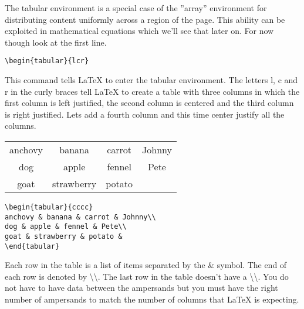 \vspace*{2ex}

The tabular environment is a special case of the ''array'' environment for distributing content uniformly across a region of the page.  This ability can be exploited in mathematical equations which we'll see that later on. For now though look at the first line.

\vspace*{2ex}

\begin{verbatim}
\begin{tabular}{lcr}
\end{verbatim}

\vspace*{2ex}

This command tells LaTeX to enter the tabular environment. The letters l, c and r in the curly braces tell LaTeX to create a table with three columns in which the first column is left justified, the second column is centered and the third column is right justified. Lets add a fourth column and this time center justify all the columns.

\begin{center}
\begin{tabular}{cccc}
anchovy & banana & carrot & Johnny\\
dog & apple & fennel & Pete\\
goat & strawberry & potato &
\end{tabular}

\vspace*{2ex}

\begin{verbatim}
\begin{tabular}{cccc}
anchovy & banana & carrot & Johnny\\
dog & apple & fennel & Pete\\
goat & strawberry & potato &
\end{tabular}
\end{verbatim}
\end{center}

\vspace*{2ex}

Each row in the table is a list of items separated by the {\&} symbol. The end of each row is denoted by \textbackslash\textbackslash.  The last row in the table doesn't have a \textbackslash\textbackslash. You do not have to have data between the ampersands but you must have the right number of ampersands to match the number of columns that LaTeX is expecting.

